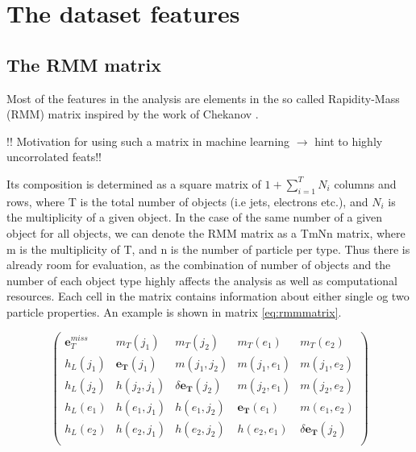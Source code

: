 \section{The dataset features}

\subsection*{The RMM matrix}
Most of the features in the analysis are elements in the so called Rapidity-Mass (RMM) matrix inspired by the work of Chekanov \cite{Chekanov_2019}.
\par
!! Motivation for using such a matrix in machine learning $\to$ hint to highly uncorrolated feats!!
\par
Its composition is determined as a square matrix of $1 + \sum_{i=1}^{T}N_i$ columns and rows, where T is the total number of objects (i.e jets, electrons etc.),
and $N_i$ is the multiplicity of a given object. In the case of the same number of a given object for all objects, we can denote the RMM matrix as a 
TmNn matrix, where m is the multiplicity of T, and n is the number of particle per type. Thus there is already room for evaluation, as the combination of number of objects 
and the number of each object type highly affects the analysis as well as computational resources. Each cell in the matrix contains information about
either single og two particle properties. An example is shown in matrix \ref{eq:rmmmatrix}.

\begin{equation}\label{eq:rmmmatrix}
\begin{pmatrix}
    \boldsymbol{e}_{T}^{miss} & m_T(j_1) & m_T(j_2) &  m_T(e_1) &  m_T(e_2)\\
    h_L(j_1) & \boldsymbol{e_T}(j_1) & m(j_1, j_2) & m(j_1, e_1) & m(j_1, e_2)\\
    h_L(j_2) & h(j_2, j_1) & \delta \boldsymbol{e_T}(j_2)& m(j_2, e_1) & m(j_2, e_2)\\
    h_L(e_1) & h(e_1, j_1) & h(e_1, j_2) & \boldsymbol{e_T}(e_1) & m(e_1, e_2)\\
    h_L(e_2) & h(e_2, j_1) & h(e_2, j_2) & h(e_2, e_1) & \delta \boldsymbol{e_T}(j_2)\\
\end{pmatrix}
\end{equation}

